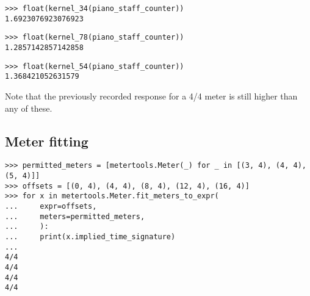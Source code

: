 \begin{singlespacing}
\vspace{-0.5\baselineskip}
\begin{lstlisting}
>>> float(kernel_34(piano_staff_counter))
1.6923076923076923
\end{lstlisting}
\begin{lstlisting}
>>> float(kernel_78(piano_staff_counter))
1.2857142857142858
\end{lstlisting}
\begin{lstlisting}
>>> float(kernel_54(piano_staff_counter))
1.368421052631579
\end{lstlisting}
\end{singlespacing}

\noindent Note that the previously recorded response for a 4/4 meter is still
higher than any of these.

\subsection{Meter fitting} %

\begin{comment}
<abjad>
permitted_meters = [metertools.Meter(_) for _ in [(3, 4), (4, 4), (5, 4)]]
offsets = [(0, 4), (4, 4), (8, 4), (12, 4), (16, 4)]
for x in metertools.Meter.fit_meters_to_expr(
    expr=offsets,
    meters=permitted_meters,
    ):
    print(x.implied_time_signature)

</abjad>
\end{comment}

\begin{singlespacing}
\vspace{-0.5\baselineskip}
\begin{lstlisting}
>>> permitted_meters = [metertools.Meter(_) for _ in [(3, 4), (4, 4), (5, 4)]]
>>> offsets = [(0, 4), (4, 4), (8, 4), (12, 4), (16, 4)]
>>> for x in metertools.Meter.fit_meters_to_expr(
...     expr=offsets,
...     meters=permitted_meters,
...     ):
...     print(x.implied_time_signature)
...
4/4
4/4
4/4
4/4
\end{lstlisting}
\end{singlespacing}

\begin{comment}
<abjad>
offsets = [(0, 4), (3, 4), (5, 4), (10, 4), (15, 4), (20, 4)]
for x in metertools.Meter.fit_meters_to_expr(
    expr=offsets,
    meters=permitted_meters,
    ):
    print(x.implied_time_signature)

</abjad>
\end{comment}

